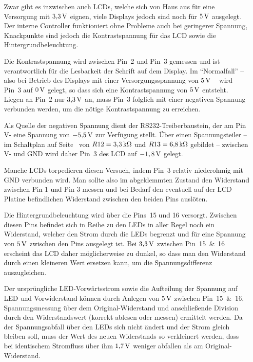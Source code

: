 \documentclass[pdftex, parskip, numbers=noenddot, toc=listof]{scrbook}
\begin{document}
	Zwar gibt es inzwischen auch LCDs, welche sich von Haus aus für eine Versorgung mit $\unit[3{,}3]{V}$ eignen, viele Displays jedoch sind noch für $\unit[5]{V}$ ausgelegt. Der interne Controller funktioniert ohne Probleme auch bei geringerer Spannung, Knackpunkte sind jedoch die Kontrastspannung für das LCD sowie die Hintergrundbeleuchtung.

	Die Kontrastspannung wird zwischen Pin~2 und Pin~3 gemessen und ist verantwortlich für die Lesbarkeit der Schrift auf dem Display. Im \enquote{Normalfall} -- also bei Betrieb des Displays mit einer Versorgungsspannung von $\unit[5]{V}$ -- wird Pin~3 auf $\unit[0]{V}$ gelegt, so dass sich eine Kontrastspannung von $\unit[5]{V}$ entsteht. Liegen an Pin~2 nur $\unit[3{,}3]{V}$ an, muss Pin~3 folglich mit einer negativen Spannung verbunden werden, um die nötige Kontrastspannung zu erreichen.

	Als Quelle der negativen Spannung dient der RS232-Treiberbaustein, der am Pin V- eine Spannung von $\unit[-5{,}5]{V}$ zur Verfügung stellt. Über einen Spannungsteiler -- im Schaltplan auf Seite~\pageref{fig:transmitterschematic} von $R12 = \unit[3{,}3]{k\Omega}$ und $R13 = \unit[6{,}8]{k\Omega}$ gebildet -- zwischen V- und GND wird daher Pin~3 des LCD auf $\unit[-1,8]{V}$ gelegt.

	Manche LCDs torpedieren diesen Versuch, indem Pin~3 relativ niederohmig mit GND verbunden wird. Man sollte also im abgeklemmten Zustand den Widerstand zwischen Pin 1 und Pin 3 messen und bei Bedarf den eventuell auf der LCD-Platine befindlichen Widerstand zwischen den beiden Pins auslöten.

	Die Hintergrundbeleuchtung wird über die Pins~15 und 16 versorgt. Zwischen diesen Pins befindet sich in Reihe zu den LEDs in aller Regel noch ein Widerstand, welcher den Strom durch die LEDs begrenzt und für eine Spannung von $\unit[5]{V}$ zwischen den Pins ausgelegt ist. Bei $\unit[3{,}3]{V}$ zwischen Pin~15~\&~16 erscheint das LCD daher möglicherweise zu dunkel, so dass man den Widerstand durch einen kleineren Wert ersetzen kann, um die Spannungsdifferenz auszugleichen.

	Der ursprüngliche LED-Vorwärtsstrom sowie die Aufteilung der Spannung auf LED und Vorwiderstand können durch Anlegen von $\unit[5]{V}$ zwischen Pin~15~\&~16, Spannungsmessung über dem Original-Widerstand und anschließende Division durch den Widerstandswert (korrekt ablesen oder messen) ermittelt werden. Da der Spannungsabfall über den LEDs sich nicht ändert und der Strom gleich bleiben soll, muss der Wert des neuen Widerstands so verkleinert werden, dass bei identischem Stromfluss über ihm $\unit[1{,}7]{V}$ weniger abfallen als am Original-Widerstand.
\end{document}
